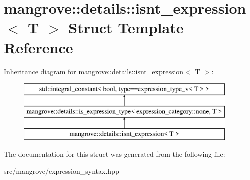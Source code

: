 \hypertarget{structmangrove_1_1details_1_1isnt__expression}{}\section{mangrove\+:\+:details\+:\+:isnt\+\_\+expression$<$ T $>$ Struct Template Reference}
\label{structmangrove_1_1details_1_1isnt__expression}
Inheritance diagram for mangrove\+:\+:details\+:\+:isnt\+\_\+expression$<$ T $>$\+:\begin{figure}[H]
\begin{center}
\leavevmode
\includegraphics[height=3.000000cm]{structmangrove_1_1details_1_1isnt__expression}
\end{center}
\end{figure}


The documentation for this struct was generated from the following file\+:\begin{DoxyCompactItemize}
\item 
src/mangrove/expression\+\_\+syntax.\+hpp\end{DoxyCompactItemize}
